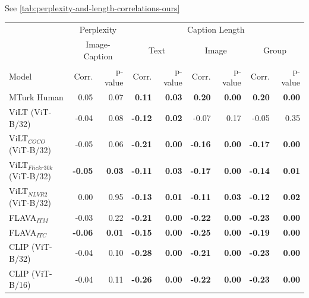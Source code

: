 See \cref{tab:perplexity-and-length-correlations-ours}

\begin{table}[ht]
\centering
\begin{adjustbox}{max width=\textwidth}
\begin{tabular}{l|rr|rrrrrr}
\toprule
 & \multicolumn{2}{c|}{Perplexity} &  \multicolumn{6}{c}{Caption Length}\\
 & \multicolumn{2}{c|}{Image-Caption} &  \multicolumn{2}{c}{Text} &  \multicolumn{2}{c}{Image} &  \multicolumn{2}{c}{Group}\\
 Model      &   Corr. &   p-value & Corr. &   p-value & Corr. &   p-value & Corr. &   p-value\\\midrule 
MTurk Human                         & 0.05           & 0.07          & \textbf{0.11}  & \textbf{0.03} & \textbf{0.20}  & \textbf{0.00} & \textbf{0.20}  & \textbf{0.00} \\
 ViLT (ViT-B/32)                     & -0.04          & 0.08          & \textbf{-0.12} & \textbf{0.02} & -0.07          & 0.17          & -0.05          & 0.35          \\
 ViLT$_{COCO}$ (ViT-B/32)            & -0.05          & 0.06          & \textbf{-0.21} & \textbf{0.00} & \textbf{-0.16} & \textbf{0.00} & \textbf{-0.17} & \textbf{0.00} \\
 ViLT$_{Flickr30k}$ (ViT-B/32)       & \textbf{-0.05} & \textbf{0.03} & \textbf{-0.11} & \textbf{0.03} & \textbf{-0.17} & \textbf{0.00} & \textbf{-0.14} & \textbf{0.01} \\
 ViLT$_{NLVR2}$ (ViT-B/32)           & 0.00           & 0.95          & \textbf{-0.13} & \textbf{0.01} & \textbf{-0.11} & \textbf{0.03} & \textbf{-0.12} & \textbf{0.02} \\
 FLAVA$_{ITM}$                       & -0.03          & 0.22          & \textbf{-0.21} & \textbf{0.00} & \textbf{-0.22} & \textbf{0.00} & \textbf{-0.23} & \textbf{0.00} \\
 FLAVA$_{ITC}$                       & \textbf{-0.06} & \textbf{0.01} & \textbf{-0.15} & \textbf{0.00} & \textbf{-0.25} & \textbf{0.00} & \textbf{-0.19} & \textbf{0.00} \\
 CLIP (ViT-B/32)                     & -0.04          & 0.10          & \textbf{-0.28} & \textbf{0.00} & \textbf{-0.21} & \textbf{0.00} & \textbf{-0.23} & \textbf{0.00} \\
 CLIP (ViT-B/16)                     & -0.04          & 0.11          & \textbf{-0.26} & \textbf{0.00} & \textbf{-0.22} & \textbf{0.00} & \textbf{-0.23} & \textbf{0.00} \\

\end{tabular}
\end{adjustbox}
\end{table}
